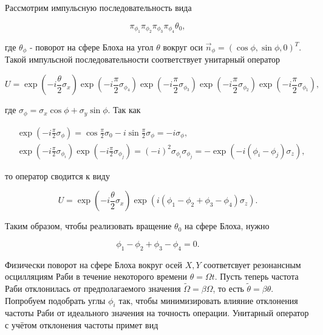 Рассмотрим импульсную последовательность вида

\begin{equation}
	\pi_{\phi_1} \pi_{\phi_2} \pi_{\phi_3} \pi_{\phi_4} \theta_0,
\end{equation}

где $\theta_\phi$ - поворот на сфере Блоха на угол $\theta$ вокруг оси $\vec{n}_\phi = \left(\cos \phi, \sin \phi, 0 \right)^T$. Такой импульсной последовательности соответствует унитарный оператор 

\begin{equation}
	U = \exp\left( - i \frac{\theta}{2} \sigma_x \right)\exp\left( - i \frac{\pi}{2} \sigma_{\phi_4}\right)\exp\left( - i \frac{\pi}{2} \sigma_{\phi_3}\right)\exp\left( - i \frac{\pi}{2} \sigma_{\phi_2}\right)\exp\left( - i \frac{\pi}{2} \sigma_{\phi_1}\right),
\end{equation}

где $\sigma_\phi = \sigma_x\cos \phi + \sigma_y\sin \phi$. Так как 

\begin{equation}
	\begin{aligned}
		& \exp\left(-i \frac{\pi}{2} \sigma_\phi \right) = \cos \frac{\pi}{2} \sigma_0 - i\sin \frac{\pi}{2} \sigma_\phi = -i\sigma_\phi ,\\
		& \exp\left( - i \frac{\pi}{2} \sigma_{\phi_i}\right)\exp\left( - i \frac{\pi}{2} \sigma_{\phi_j}\right) = (-i)^2 \sigma_{\phi_i} \sigma_{\phi_j} = - \exp\left(-i(\phi_i - \phi_j)\sigma_z \right),
	\end{aligned}
\end{equation}

то оператор сводится к виду

\begin{equation}
	U = \exp\left( - i \frac{\theta}{2} \sigma_x \right)\exp\left( i(\phi_1 - \phi_2 +\phi_3 - \phi_4) \sigma_z\right).
\end{equation} 

Таким образом, чтобы реализовать вращение $\theta_0$ на сфере Блоха, нужно 

\begin{equation}
	\phi_1 - \phi_2 +\phi_3 - \phi_4 = 0.
\end{equation}

Физически поворот на сфере Блоха вокруг осей $X, Y$ соответсвует резонансным осцилляциям Раби в течение некоторого времени $\theta = \Omega t$. Пусть теперь частота Раби отклонилась от предполагаемого значения $\tilde{\Omega} = \beta \Omega$, то есть $\tilde{\theta} = \beta \theta$. Попробуем подобрать углы $\phi_i$ так, чтобы минимизировать влияние отклонения частоты Раби от идеального значения на точность операции. Унитарный оператор с учётом отклонения частоты примет вид


